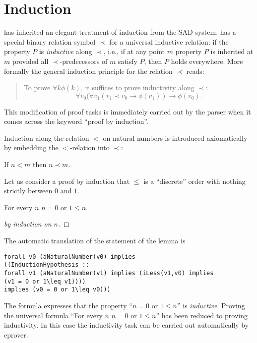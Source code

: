 \documentclass{stex}
\begin{document}
\section{Induction}

\Naproche{} has inherited an elegant treatment of induction
from the SAD system. \Naproche{} has a special binary relation
symbol $\prec$ for a universal inductive relation: if
the property $P$ is \textit{inductive} along $\prec$, i.e., if at any
point $m$ property $P$ is inherited at $m$ provided all
$\prec$-predecessors of $m$ satisfy $P$, then $P$ holds everywhere.
More formally the general induction principle for the relation
$\prec$ reads:
\begin{quotation}
To prove $\forall k \phi(k)$, it suffices to prove
inductivity along $\prec$:
$$\forall v_0 (\forall v_1 (v_1 \prec v_0 \rightarrow \phi(v_1))
\rightarrow \phi(v_0).$$
\end{quotation}

This modification of proof tasks
is immediately carried out by the parser when it comes across the
keyword ``proof by induction''.

Induction along the relation $<$ on natural numbers is introduced
axiomatically by embedding the $<$-relation into $\prec$:

\begin{forthel}
\begin{axiom} If $n < m$ then $n \prec m$.
\end{axiom}
\end{forthel}

Let us consider a proof by induction that $\leq$ is
a ``discrete'' order with nothing strictly between
$0$ and $1$.

\begin{forthel}
\begin{lemma} For every $n$ $n = 0$ or $1 \leq n$.
\end{lemma}
\begin{proof}[by induction on $n$]
\end{proof}
\end{forthel}

The automatic translation of the statement of the lemma is
\begin{verbatim}
forall v0 (aNaturalNumber(v0) implies
((InductionHypothesis ::
forall v1 (aNaturalNumber(v1) implies (iLess(v1,v0) implies
(v1 = 0 or 1\leq v1))))
implies (v0 = 0 or 1\leq v0)))
\end{verbatim}

The formula expresses that the property ``$n = 0$ or $1 \leq n$''
is \textit{inductive}. Proving the universal formula
``For every $n$ $n = 0$ or $1 \leq n$'' has been reduced to
proving inductivity. In this case the inductivity task can be
carried out automatically by
eprover.
\end{document}
